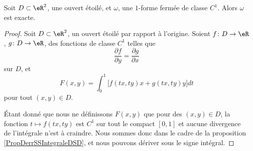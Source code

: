 \begin{theorem} \label{ThoMSofFxL}
Soit $D\subset\eR^2$, une ouvert étoilé, et $\omega$, une $1$-forme fermée de classe $C^1$. Alors $\omega$ est exacte.
\end{theorem}
\begin{proof}

Soit $D\subset\eR^2$, un ouvert étoilé par rapport à l'origine. Soient $f\colon D\to \eR$, $g\colon D\to \eR$, des fonctions de classe $C^1$ telles que
\begin{equation}
	\frac{ \partial f }{ \partial y }=\frac{ \partial g }{ \partial x }
\end{equation}
sur $D$, et
\begin{equation}		\label{EqIMDefFformI33}
	F(x,y)=\int_0^1\big[  f(tx,ty)x+g(tx,ty)y  \big]dt
\end{equation}
pour tout $(x,y)\in D$. 

Étant donné que nous ne définissons $F(x,y)$ que pour des $(x,y)\in D$, la fonction $t\mapsto f(tx,ty)$ est $C^1$ sur tout le compact $[0,1]$ et aucune divergence de l'intégrale n'est à craindre. Nous sommes donc dans le cadre de la proposition \ref{PropDerrSSIntegraleDSD}, et nous pouvons dériver sous le signe intégral.


\end{proof}

